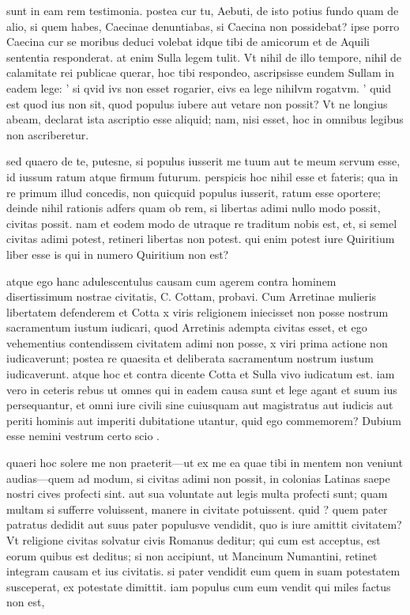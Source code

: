  sunt in eam rem testimonia. postea cur tu, Aebuti, de isto potius fundo quam de alio, si quem habes, Caecinae denuntiabas, si Caecina non possidebat? ipse porro Caecina cur se moribus deduci volebat idque tibi de amicorum et de Aquili sententia responderat. at enim Sulla legem tulit. Vt nihil de illo tempore, nihil de calamitate rei publicae querar, hoc tibi respondeo, ascripsisse eundem Sullam in eadem lege: ' si qvid ivs non esset rogarier, eivs ea lege nihilvm rogatvm. ' quid est quod ius non sit, quod populus iubere aut vetare non possit? Vt ne longius abeam, declarat ista ascriptio esse aliquid; nam, nisi esset, hoc in omnibus legibus non ascriberetur.

 sed quaero de te, putesne, si populus iusserit me tuum aut te meum servum esse, id iussum ratum atque firmum futurum. perspicis hoc nihil esse et fateris; qua in re primum illud concedis, non quicquid populus iusserit, ratum esse oportere; deinde nihil rationis adfers quam ob rem, si libertas adimi nullo modo possit, civitas possit. nam et eodem modo de utraque re traditum nobis est, et, si semel civitas adimi potest, retineri libertas non potest. qui enim potest iure Quiritium liber esse is qui in numero Quiritium non est?

 atque ego hanc adulescentulus causam cum agerem contra hominem disertissimum nostrae civitatis, C. Cottam, probavi. Cum Arretinae mulieris libertatem defenderem et Cotta x viris religionem iniecisset non posse nostrum sacramentum iustum iudicari, quod Arretinis adempta civitas esset, et ego vehementius contendissem civitatem adimi non posse, x viri prima actione non iudicaverunt; postea re quaesita et deliberata sacramentum nostrum iustum iudicaverunt. atque hoc et contra dicente Cotta et Sulla vivo iudicatum est. iam vero in ceteris rebus ut omnes qui in eadem causa sunt et lege agant et suum ius persequantur, et omni iure civili sine cuiusquam aut magistratus aut iudicis aut periti hominis aut imperiti dubitatione utantur, quid ego commemorem? Dubium esse nemini vestrum certo scio .

 quaeri hoc solere me non praeterit—ut ex me ea quae tibi in mentem non veniunt audias—quem ad modum, si civitas adimi non possit, in colonias Latinas saepe nostri cives profecti sint. aut sua voluntate aut legis multa profecti sunt; quam multam si sufferre voluissent, manere in civitate potuissent. quid ? quem pater patratus dedidit aut suus pater populusve vendidit, quo is iure amittit civitatem? Vt religione civitas solvatur civis Romanus deditur; qui cum est acceptus, est eorum quibus est deditus; si non accipiunt, ut Mancinum Numantini, retinet integram causam et ius civitatis. si pater vendidit eum quem in suam potestatem susceperat, ex potestate dimittit. iam populus cum eum vendit qui miles factus non est,

